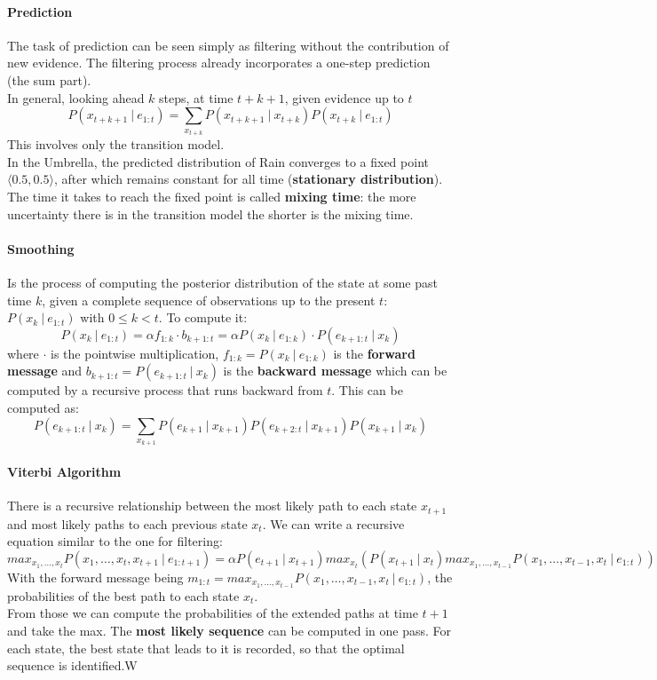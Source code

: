 \documentclass[10pt]{report}
\begin{document}
\paragraph{Prediction} The task of prediction can be seen simply as filtering without the contribution of new evidence. The filtering process already incorporates a one-step prediction (the sum part).\\
In general, looking ahead $k$ steps, at time $t+k+1$, given evidence up to $t$ $$P(x_{t+k+1}\:|\:e_{1:t})=\sum_{x_{t+k}} P(x_{t+k+1}\:|\:x_{t+k})P(x_{t+k}\:|\:e_{1:t})$$
This involves only the transition model.\\
In the Umbrella, the predicted distribution of Rain converges to a fixed point $\langle 0.5,0.5\rangle$, after which remains constant for all time (\textbf{stationary distribution}). The time it takes to reach the fixed point is called \textbf{mixing time}: the more uncertainty there is in the transition model the shorter is the mixing time.
\paragraph{Smoothing} Is the process of computing the posterior distribution of the state at some past time $k$, given a complete sequence of observations up to the present $t$: $P(x_k\:|\:e_{1:t})$ with $0\leq k< t$. To compute it:
$$P(x_k\:|\:e_{1:t}) = \alpha f_{1:k}\cdot b_{k+1:t} = \alpha  P(x_k\:|\:e_{1:k}) \cdot P(e_{k+1:t}\:|\:x_k)$$ where $\cdot$ is the pointwise multiplication, $f_{1:k} = P(x_k\:|\:e_{1:k})$ is the \textbf{forward message} and $b_{k+1:t} = P(e_{k+1:t}\:|\:x_k)$ is the \textbf{backward message} which can be computed by a recursive process that runs backward from $t$. This can be computed as: $$P(e_{k+1:t}\:|\:x_k) = \sum_{x_{k+1}} P(e_{k+1}\:|\:x_{k+1})P(e_{k+2:t}\:|\:x_{k+1})P(x_{k+1}\:|\:x_k)$$
\paragraph{Viterbi Algorithm}
There is a recursive relationship between the most likely path to each state $x_{t+1}$ and most likely paths to each previous state $x_t$. We can write a recursive equation similar to the one for filtering: $$max_{x_1,\ldots,x_t} P(x_1,\ldots,x_t,x_{t+1}\:|\:e_{1:t+1}) = \alpha P(e_{t+1}\:|\:x_{t+1})max_{x_t}(P(x_{t+1}\:|\:x_t) max_{x_1,\ldots,x_{t-1}} P(x_1,\ldots,x_{t-1},x_t\:|\:e_{1:t}))$$
With the forward message being $m_{1:t} = max_{x_1,\ldots,x_{t-1}} P(x_1,\ldots,x_{t-1},x_t\:|\:e_{1:t})$, the probabilities of the best path to each state $x_t$.\\From those we can compute the probabilities of the extended paths at time $t+1$ and take the max. The \textbf{most likely sequence} can be computed in one pass. For each state, the best state that leads to it is recorded, so that the optimal sequence is identified.W
\end{document}
